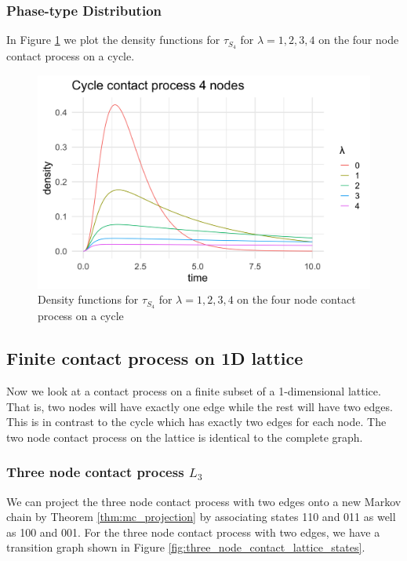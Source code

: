 \subsubsection{Phase-type Distribution}

In Figure \ref{fig:contact_4_cycle_phase_densities} we plot the density functions for $\tau_{S_4}$ for $\lambda = 1, 2, 3, 4$ on the four node contact process on a cycle.

\begin{figure}[H]
  \centering
    \includegraphics[width=.80\textwidth]{figures/cycle_4_contact_phase_densities.png}
   \caption{Density functions for $\tau_{S_4}$ for $\lambda = 1, 2, 3, 4$ on the four node contact process on a cycle}
  \label{fig:contact_4_cycle_phase_densities}
\end{figure}

\subsection{Finite contact process on 1D lattice}

Now we look at a contact process on a finite subset of a 1-dimensional lattice.
That is, two nodes will have exactly one edge while the rest will have two edges.
This is in contrast to the cycle which has exactly two edges for each node.
The two node contact process on the lattice is identical to the complete graph.

\subsubsection{Three node contact process \texorpdfstring{$L_3$}{L3}}
We can project the three node contact process with two edges onto a new Markov chain by Theorem \ref{thm:mc_projection} by associating states 110 and 011 as well as 100 and 001.
For the three node contact process with two edges, we have a transition graph shown in Figure \ref{fig:three_node_contact_lattice_states}.

